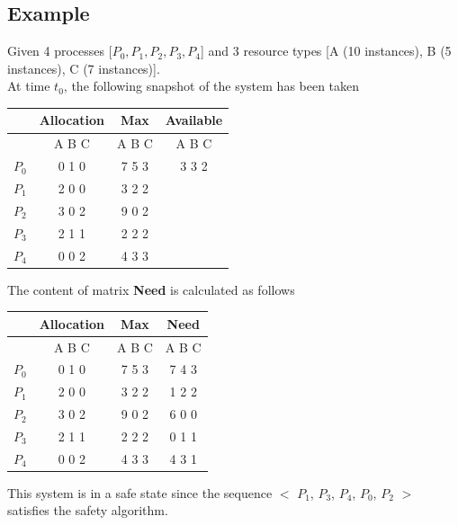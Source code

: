 \documentclass{book/custombook}
\begin{document}
            \subsection{Example}
                Given 4 processes [$P_0, P_1, P_2, P_3, P_4$] and 3 resource types [A (10 instances), B (5 instances), C (7 instances)].\\
                At time $t_0$, the following snapshot of the system has been taken\\
                \begin{center}
                    \begin{tabular}{cccc}
                        & Allocation & Max & Available\\
                        \toprule
                        & A B C & A B C & A B C\\
                        $P_0$ & 0 1 0 & 7 5 3 & 3 3 2\\
                        $P_1$ & 2 0 0 & 3 2 2 & \\
                        $P_2$ & 3 0 2 & 9 0 2 & \\
                        $P_3$ & 2 1 1 & 2 2 2 & \\
                        $P_4$ & 0 0 2 & 4 3 3 & \\
                        \bottomrule
                    \end{tabular}
                \end{center}
                The content of matrix \textbf{Need} is calculated as follows
                \begin{center}
                    \begin{tabular}{cccc}
                        & Allocation & Max & Need\\
                        \toprule
                        & A B C & A B C & A B C\\
                        $P_0$ & 0 1 0 & 7 5 3 & 7 4 3\\
                        $P_1$ & 2 0 0 & 3 2 2 & 1 2 2\\
                        $P_2$ & 3 0 2 & 9 0 2 & 6 0 0\\
                        $P_3$ & 2 1 1 & 2 2 2 & 0 1 1\\
                        $P_4$ & 0 0 2 & 4 3 3 & 4 3 1\\
                        \bottomrule
                    \end{tabular}
                \end{center}
                This system is in a safe state since the sequence $<$ $P_1$, $P_3$, $P_4$, $P_0$, $P_2$ $>$ satisfies the safety algorithm.\\
\end{document}

